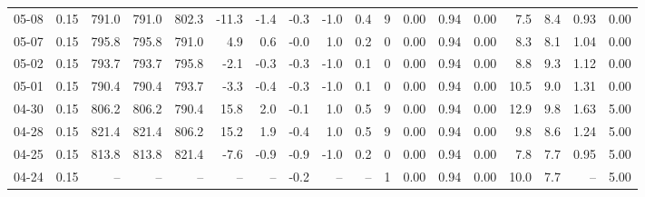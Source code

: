 \begin{threeparttable}
{\begin{tabular}{lrrrrrrrrrrrrrrrrr}
  05-08 &     0.15 & 791.0 & 791.0 & 802.3 &      -11.3 &           -1.4 &                      -0.3 &                     -1.0 &                 0.4 &              9 &       0.00 &      0.94 &           0.00 &              7.5 &                 8.4 &            0.93 &                   0.00 \\
  05-07 &     0.15 & 795.8 & 795.8 & 791.0 &        4.9 &            0.6 &                      -0.0 &                      1.0 &                 0.2 &              0 &       0.00 &      0.94 &           0.00 &              8.3 &                 8.1 &            1.04 &                   0.00 \\
  05-02 &     0.15 & 793.7 & 793.7 & 795.8 &       -2.1 &           -0.3 &                      -0.3 &                     -1.0 &                 0.1 &              0 &       0.00 &      0.94 &           0.00 &              8.8 &                 9.3 &            1.12 &                   0.00 \\
  05-01 &     0.15 & 790.4 & 790.4 & 793.7 &       -3.3 &           -0.4 &                      -0.3 &                     -1.0 &                 0.1 &              0 &       0.00 &      0.94 &           0.00 &             10.5 &                 9.0 &            1.31 &                   0.00 \\
  04-30 &     0.15 & 806.2 & 806.2 & 790.4 &       15.8 &            2.0 &                      -0.1 &                      1.0 &                 0.5 &              9 &       0.00 &      0.94 &           0.00 &             12.9 &                 9.8 &            1.63 &                   5.00 \\
  04-28 &     0.15 & 821.4 & 821.4 & 806.2 &       15.2 &            1.9 &                      -0.4 &                      1.0 &                 0.5 &              9 &       0.00 &      0.94 &           0.00 &              9.8 &                 8.6 &            1.24 &                   5.00 \\
  04-25 &     0.15 & 813.8 & 813.8 & 821.4 &       -7.6 &           -0.9 &                      -0.9 &                     -1.0 &                 0.2 &              0 &       0.00 &      0.94 &           0.00 &              7.8 &                 7.7 &            0.95 &                   5.00 \\
  04-24 &     0.15 &    -- &    -- &    -- &         -- &             -- &                      -0.2 &                       -- &                  -- &              1 &       0.00 &      0.94 &           0.00 &             10.0 &                 7.7 &              -- &                   5.00 \\

\end{tabular}}
\end{threeparttable}

